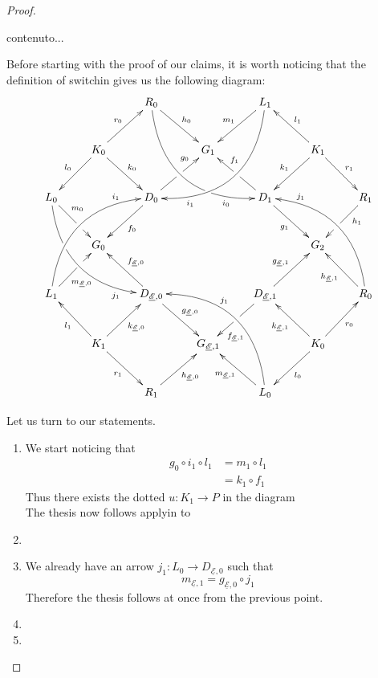 \documentclass[a4paper,UKenglish,cleveref,pdftex, thm-restate,numberwithinsect]{lipics}
\newcommand{\dder}[1]{\mathscr{#1}}
\newcommand{\der}[1]{\underline{\dder{#1}}}
\begin{document}
\begin{proof}
	\begin{proofEnd}
		contenuto...
	\end{proofEnd} \qedhere 
	Before starting with the proof of our claims, it is worth noticing that the definition of switchin gives us the following diagram:
			\[\xymatrix@R=28pt{&&R_0 \ar@/_1.15cm/[ddrr]_(.8){i_0}|(.68)\hole \ar[dr]^{h_0}&& L_1\ar@/^1.15cm/[ddll]^(.8){i_1}  \ar[dl]_{m_1}\\&K_0\ar[dr]^{k_0}\ar[dl]_{l_0} \ar[ur]^{r_0}&& G_1 && K_1 \ar[dl]_{k_1}\ar[lu]_{l_1} \ar[dr]^{r_1}\\L_0 \ar@/_.94cm/[ddrr]_(.8){j_1}|(.31)\hole \ar[dr]^(.35){m_0}|(.6)\hole && D_0 \ar[dl]^{f_0}\ar[ur]|(.5)\hole^(.7){g_0}&&D_1 \ar[dr]_{g_1} \ar[ul]|(.5)\hole_(.65){f_1}&&R_1\ar[dl]^(.35){h_1}|(.6)\hole\\&G_0 &&&&G_2\\L_1 \ar@/^.94cm/[uurr]^(.8){i_1} \ar[ur]_(.35){m_{\der{E},0}}|(.61)\hole&&D_{\der{E},0} \ar[ul]_{f_{\der{E},0}}\ar[dr]^{g_{\der{E},0}} &&D_{\der{E},1}\ar[ur]^{g_{\der{E},1}} \ar[dl]|(.5)\hole^(.7){f_{\der{E},1}} && R_0  \ar@/_.94cm/[uull]_(.8){j_1} \ar[ul]^{h_{\der{E},1}}\\&K_1 \ar[ur]_{k_{\der{E},0}} \ar[dr]_{r_1} \ar[ul]^{l_1}&&G_{\der{E},1}&& K_0 \ar[ur]_{r_0} \ar[ul]^{k_{\der{E},1}} \ar[dl]^{l_0} \\&& R_1 \ar[ur]_{h_{\der{E},0}}&& L_0 \ar[ul]^{m_{\der{E},1}} \ar@/_1.15cm/[uull]_(.6){j_1} }\]
			
			Let us turn to our statements.
	\begin{enumerate}
		\item We start noticing that 
		\begin{align*}
			g_0\circ i_1\circ l_1&=m_1\circ l_1\\&=k_1\circ f_1
		\end{align*}
		Thus there exists the dotted $u\colon K_1\to P$ in the diagram
		\[\]
		The thesis now follows applyin  to
		
		

		\item 
		\item  We already have an arrow $j_1\colon L_0\to D_{\der{E},0}$ such that
		\[m_{\der{E},1}=g_{\der{E},0}\circ j_1\]
		Therefore the thesis follows at once from the previous point.

	
	
	\item 
		
		\item \qedhere 
	\end{enumerate}
\end{proof}
\end{document}
